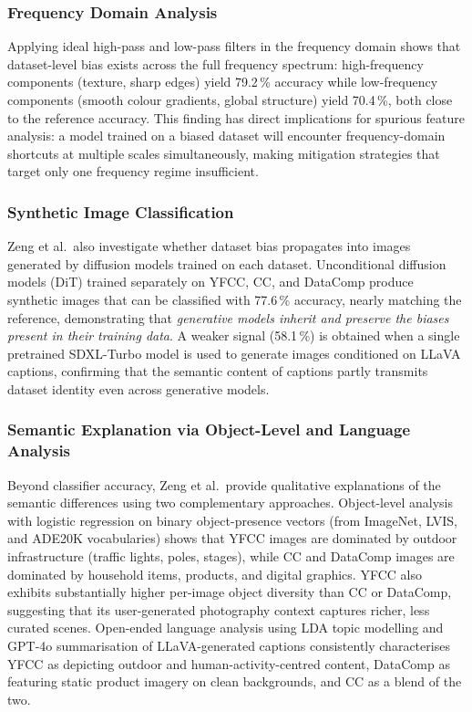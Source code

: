 \subsubsection*{Frequency Domain Analysis}

Applying ideal high-pass and low-pass filters in the frequency domain shows that dataset-level
bias exists across the full frequency spectrum: high-frequency components (texture, sharp
edges) yield 79.2\,\% accuracy while low-frequency components (smooth colour gradients,
global structure) yield 70.4\,\%, both close to the reference accuracy.  This finding has
direct implications for spurious feature analysis: a model trained on a biased dataset will
encounter frequency-domain shortcuts at multiple scales simultaneously, making mitigation
strategies that target only one frequency regime insufficient.

\subsubsection*{Synthetic Image Classification}

Zeng et al.\ also investigate whether dataset bias propagates into images generated by
diffusion models trained on each dataset.  Unconditional diffusion models (DiT) trained
separately on YFCC, CC, and DataComp produce synthetic images that can be classified with
77.6\,\% accuracy, nearly matching the reference, demonstrating that \emph{generative models
	inherit and preserve the biases present in their training data}.  A weaker signal (58.1\,\%)
is obtained when a single pretrained SDXL-Turbo model is used to generate images conditioned
on LLaVA captions, confirming that the semantic content of captions partly transmits dataset
identity even across generative models.

\subsubsection*{Semantic Explanation via Object-Level and Language Analysis}

Beyond classifier accuracy, Zeng et al.\ provide qualitative explanations of the semantic
differences using two complementary approaches.  Object-level analysis with logistic
regression on binary object-presence vectors (from ImageNet, LVIS, and ADE20K vocabularies)
shows that YFCC images are dominated by outdoor infrastructure (traffic lights, poles,
stages), while CC and DataComp images are dominated by household items, products, and digital
graphics.  YFCC also exhibits substantially higher per-image object diversity than CC or
DataComp, suggesting that its user-generated photography context captures richer, less
curated scenes.  Open-ended language analysis using LDA topic modelling and GPT-4o
summarisation of LLaVA-generated captions consistently characterises YFCC as depicting
outdoor and human-activity-centred content, DataComp as featuring static product imagery on
clean backgrounds, and CC as a blend of the two.



